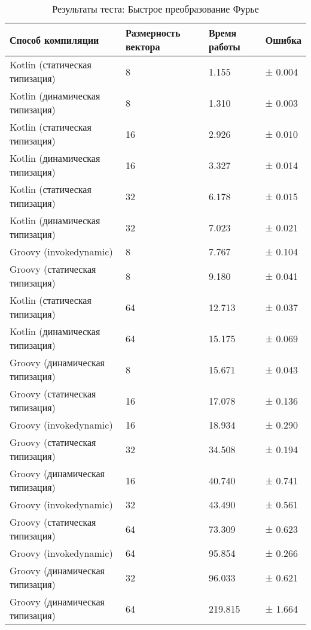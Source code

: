 \begin{table}[h]
\caption{\label{tab:fftResults}Результаты теста: Быстрое преобразование Фурье}
\begin{center}
\begin{tabular}{|l|p{}|l|l|}
\hline
Способ компиляции & Размерность вектора	& Время работы & Ошибка \\
\hline
Kotlin (статическая типизация)           &  8 &   1.155 & ± 0.004 \\
Kotlin (динамическая типизация)          &  8 &   1.310 & ± 0.003 \\
Kotlin (статическая типизация)           & 16 &   2.926 & ± 0.010 \\
Kotlin (динамическая типизация)          & 16 &   3.327 & ± 0.014 \\
Kotlin (статическая типизация)           & 32 &   6.178 & ± 0.015 \\
Kotlin (динамическая типизация)          & 32 &   7.023 & ± 0.021 \\
Groovy (invokedynamic)                   &  8 &   7.767 & ± 0.104 \\
Groovy (статическая типизация)           &  8 &   9.180 & ± 0.041 \\
Kotlin (статическая типизация)           & 64 &  12.713 & ± 0.037 \\
Kotlin (динамическая типизация)          & 64 &  15.175 & ± 0.069 \\
Groovy (динамическая типизация)          &  8 &  15.671 & ± 0.043 \\
Groovy (статическая типизация)           & 16 &  17.078 & ± 0.136 \\
Groovy (invokedynamic)                   & 16 &  18.934 & ± 0.290 \\
Groovy (статическая типизация)           & 32 &  34.508 & ± 0.194 \\
Groovy (динамическая типизация)          & 16 &  40.740 & ± 0.741 \\
Groovy (invokedynamic)                   & 32 &  43.490 & ± 0.561 \\
Groovy (статическая типизация)           & 64 &  73.309 & ± 0.623 \\
Groovy (invokedynamic)                   & 64 &  95.854 & ± 0.266 \\
Groovy (динамическая типизация)          & 32 &  96.033 & ± 0.621 \\
Groovy (динамическая типизация)          & 64 & 219.815 & ± 1.664 \\
\hline
\end{tabular}
\end{center}
\end{table} 

